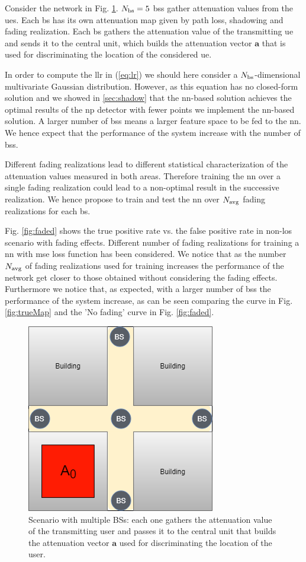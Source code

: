 \documentclass[draftcls,onecolumn,12pt]{IEEEtran}
\begin{document}
Consider the network in Fig. \ref{fig:mBS}. $N_{\rm bs}=5$ \acp{bs} gather attenuation values from the \acp{ue}. Each \ac{bs} has its own attenuation map given by path loss, shadowing and fading realization. Each \ac{bs} gathers the attenuation value of the transmitting \ac{ue} and sends it to the central unit, which builds the attenuation vector $\bm{a}$ that is used for discriminating the location of the considered \ac{ue}.

In order to compute the \ac{llr} in (\ref{eq:lr}) we should here consider a $N_{\rm bs}$-dimensional multivariate Gaussian distribution. However, as this equation has no closed-form solution and we showed in \ref{sec:shadow} that the \ac{nn}-based solution achieves the optimal results of the \ac{np} detector with fewer points we implement the \ac{nn}-based solution. A larger number of \acp{bs} means a larger feature space to be fed to the \ac{nn}. We hence expect that the performance of the system increase with the number of \acp{bs}.

Different fading realizations lead to different statistical characterization of the attenuation values measured in both areas. Therefore training the \ac{nn} over a single fading realization could lead to a non-optimal result in the successive realization. We hence propose to train and test the \ac{nn} over $N_{\rm avg}$ fading realizations for each \ac{bs}.

Fig. \ref{fig:faded} shows the true positive rate vs. the false positive rate in non-\ac{los} scenario with fading effects. Different number of fading realizations for training a \ac{nn} with \ac{mse} loss function has been considered. We notice that as the number $N_{\rm avg}$ of fading realizations used for training increases the performance of the network get closer to those obtained without considering the fading effects. Furthermore we notice that, as expected, with a larger number of \acp{bs} the performance of the system increase, as can be seen comparing the curve in Fig. \ref{fig:trueMap} and the 'No fading' curve in Fig. \ref{fig:faded}.

\begin{figure}
    \centering
    \includegraphics[width=0.3\columnwidth]{scenario2.png}
    \caption{Scenario with multiple BSs: each one gathers the attenuation value of the transmitting user and passes it to the central unit that builds the attenuation vector $\bm{a}$ used for discriminating the location of the user.}
    \label{fig:mBS}
\end{figure}
\end{document}
